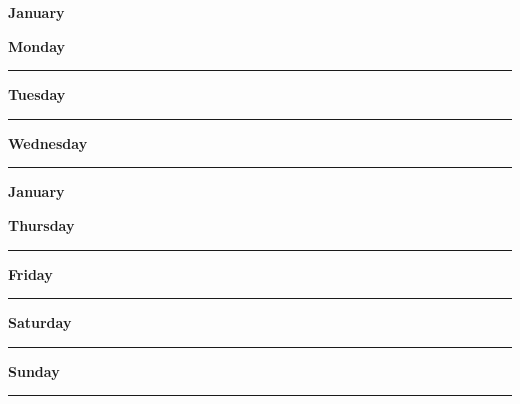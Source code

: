\newpage

\textbf{\Large{January} \hfill \Large{}}
\vspace{0.3cm}

\begin{daybox}
 \textbf{Monday} \\
\rule{\linewidth}{0.02cm}
\end{daybox}

\begin{daybox}
\textbf{Tuesday} \\
\rule{\linewidth}{0.02cm}
\end{daybox}

\begin{daybox}
\textbf{Wednesday} \\
\rule{\linewidth}{0.02cm}
\end{daybox}

\newpage

\textbf{\Large{January} \hfill \Large{}}
\vspace{0.3cm}

\begin{daybox}
\textbf{Thursday} \\
\rule{\linewidth}{0.02cm}
\end{daybox}

\begin{daybox}
\textbf{Friday} \\
\rule{\linewidth}{0.02cm}
\end{daybox}

\begin{weekendbox}
\textbf{Saturday} \\
\rule{\linewidth}{0.02cm}
\tcblower
{}
\textbf{Sunday} \\
\rule{\linewidth}{0.02cm}
\end{weekendbox}